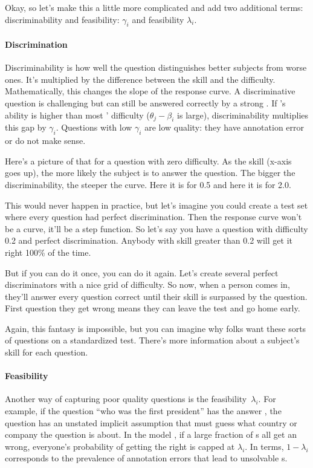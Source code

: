Okay, so let’s make this a little more complicated and add two additional
terms: discriminability and feasibility: \discability{} $\gamma_i$ and
feasibility $\lambda_i$.

\paragraph{Discrimination}

Discriminability is how well the question distinguishes better subjects from
worse ones.  It’s multiplied by the difference between the skill and the
difficulty.  Mathematically, this changes the slope of the response curve.
%
A discriminative question is challenging but can still be answered
correctly by a strong \subj{}.
If \smart{}'s ability is higher than most \itms{}' difficulty
($\theta_j-\beta_i$ is large), \itm{} discriminability multiplies this
gap by $\gamma_i$.
Questions with low $\gamma_i$ are low quality: they have annotation
error or do not make sense.

Here’s a picture of that for a question with zero difficulty.  As the skill
(x-axis goes up), the more likely the subject is to answer the question.  The
bigger the discriminability, the steeper the curve.  Here it is for 0.5 and
here it is for 2.0.

This would never happen in practice, but let’s imagine you could create a test
set where every question had perfect discrimination.  Then the response curve
won’t be a curve, it’ll be a step function.  So let’s say you have a question
with difficulty 0.2 and perfect discrimination.  Anybody with skill greater
than 0.2 will get it right 100\% of the time.

But if you can do it once, you can do it again.  Let’s create several perfect
discriminators with a nice grid of difficulty.  So now, when a person comes
in, they’ll answer every question correct until their skill is surpassed by
the question.  First question they get wrong means they can leave the test and
go home early.

Again, this fantasy is impossible, but you can imagine why folks want these
sorts of questions on a standardized test.  There’s more information about a
subject’s skill for each question.

\paragraph{Feasibility}

Another way of capturing poor quality questions is the
feasibility~$\lambda_i$.
For example, if the question ``who was the first president'' has the
answer , the question has an unstated implicit
assumption that \subjs{} must guess what country or company the
question is about.
In the model {\bf {}}, if a large fraction of \subj{}s all get an
\itm{} wrong, everyone's probability of getting the \itm{} right is
capped at $\lambda_i$.
In \nlp{} terms, $1-\lambda_i$ corresponds to the prevalence of annotation
errors that lead to unsolvable \itm{}s.


